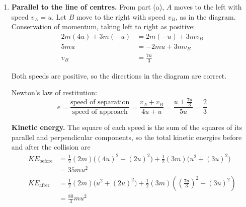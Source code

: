 \documentclass[leqno]{article}
\begin{document}
\begin{enumerate}[
  label=\textbf{\arabic*.},
  leftmargin=*,
  topsep=0pt,
  partopsep=0pt,
  parsep=0pt
]
\begin{djsSolution}
\begin{enumerate}[label=\textbf{(\alph*)}, start=1]
\textbf{Deflection of \(A\).} After the collision, let \(A\) move to the left along the line of centres with speed \(v_A\), as in the diagram. The direction of motion of \(A\) turns through \(90^\circ\), so its velocities before and after the collision are perpendicular. In (parallel, perpendicular) components:
\begin{align*}
\begin{pmatrix}4u\\-2u\end{pmatrix}\cdot\begin{pmatrix}-v_A\\-2u\end{pmatrix}&=0\\
-4uv_A+4u^2&=0\\
v_A&=u
\end{align*}

So after the collision \(A\) moves with speed \(u\) along the line of centres, in the direction of \(-\mathbf{i}\), and \(2u\) perpendicular to it, in the direction of \(-\mathbf{j}\):
\[
\mathbf{v}_A=u(-\mathbf{i}-2\mathbf{j})
\]

\item \textbf{Parallel to the line of centres.} From part (a), \(A\) moves to the left with speed \(v_A=u\). Let \(B\) move to the right with speed \(v_B\), as in the diagram. Conservation of momentum, taking left to right as positive:
\begin{align*}
2m(4u)+3m(-u)&=2m(-u)+3mv_B\\
5mu&=-2mu+3mv_B\\
v_B&=\frac{7u}{3}
\end{align*}

Both speeds are positive, so the directions in the diagram are correct.

Newton's law of restitution:
\[
e=\frac{\text{speed of separation}}{\text{speed of approach}}=\frac{v_A+v_B}{4u+u}=\frac{u+\frac{7u}{3}}{5u}=\frac23
\]

\textbf{Kinetic energy.} The square of each speed is the sum of the squares of its parallel and perpendicular components, so the total kinetic energies before and after the collision are
\begin{align*}
KE_{\text{before}}&=\frac12(2m)\bigl((4u)^2+(2u)^2\bigr)+\frac12(3m)\bigl(u^2+(3u)^2\bigr)\\
&=35mu^2\\
KE_{\text{after}}&=\frac12(2m)\bigl(u^2+(2u)^2\bigr)+\frac12(3m)\left(\left(\frac{7u}{3}\right)^2+(3u)^2\right)\\
&=\frac{80}{3}mu^2
\end{align*}


\end{enumerate}
\end{djsSolution}
\end{enumerate}
\end{document}
